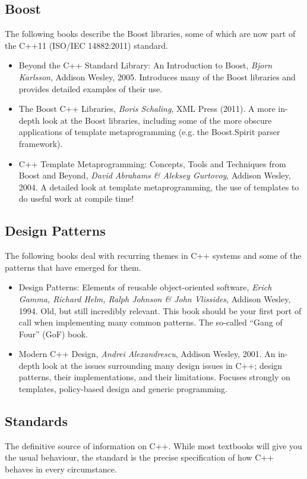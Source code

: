 \documentclass[a4paper]{scrartcl}
\begin{document}
\subsection{Boost}
The following books describe the Boost libraries, some of which are now part of the C++11 (ISO/IEC 14882:2011) standard.

\begin{itemize}
	\item Beyond the C++ Standard Library: An Introduction to Boost, \emph{Bjorn Karlsson}, Addison Wesley, 2005. Introduces many of the Boost libraries and provides detailed examples of their use.
	\item The Boost C++ Libraries, \emph{Boris Schaling}, XML Press (2011). A more in-depth look at the Boost libraries, including some of the more obscure applications of template metaprogramming (e.g. the Boost.Spirit parser framework).
	\item C++ Template Metaprogramming: Concepts, Tools and Techniques from Boost and Beyond, \emph{David Abrahams \& Aleksey Gurtovoy}, Addison Wesley, 2004. A detailed look at template metaprogramming, the use of templates to do useful work at compile time!
\end{itemize}

\subsection{Design Patterns}
The following books deal with recurring themes in C++ systems and some of the patterns that have emerged for them.

\begin{itemize}
	\item Design Patterns: Elements of reusable object-oriented software, \emph{Erich Gamma, Richard Helm, Ralph Johnson \& John Vlissides}, Addison Wesley, 1994. Old, but still incredibly relevant. This book should be your first port of call when implementing many common patterns. The so-called ``Gang of Four'' (GoF) book.
	\item Modern C++ Design, \emph{Andrei Alexandrescu}, Addison Wesley, 2001. An in-depth look at the issues surrounding many design issues in C++; design patterns, their implementations, and their limitations. Focuses strongly on templates, policy-based design and generic programming.
\end{itemize}

\subsection{Standards}
The definitive source of information on C++. While most textbooks will give you the usual behaviour, the standard is the precise specification of how C++ behaves in every circumstance.
\end{document}
